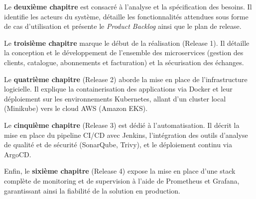 Le \textbf{deuxième chapitre} est consacré à l'analyse et la spécification des besoins. Il identifie les acteurs du système, détaille les fonctionnalités attendues sous forme de cas d'utilisation et présente le \textit{Product Backlog} ainsi que le plan de release.

Le \textbf{troisième chapitre} marque le début de la réalisation (Release 1). Il détaille la conception et le développement de l'ensemble des microservices (gestion des clients, catalogue, abonnements et facturation) et la sécurisation des échanges.

Le \textbf{quatrième chapitre} (Release 2) aborde la mise en place de l'infrastructure logicielle. Il explique la containerisation des applications via Docker et leur déploiement sur les environnements Kubernetes, allant d'un cluster local (Minikube) vers le cloud AWS (Amazon EKS).

Le \textbf{cinquième chapitre} (Release 3) est dédié à l'automatisation. Il décrit la mise en place du pipeline CI/CD avec Jenkins, l'intégration des outils d'analyse de qualité et de sécurité (SonarQube, Trivy), et le déploiement continu via ArgoCD.

Enfin, le \textbf{sixième chapitre} (Release 4) expose la mise en place d'une stack complète de monitoring et de supervision à l'aide de Prometheus et Grafana, garantissant ainsi la fiabilité de la solution en production.

\newpage

